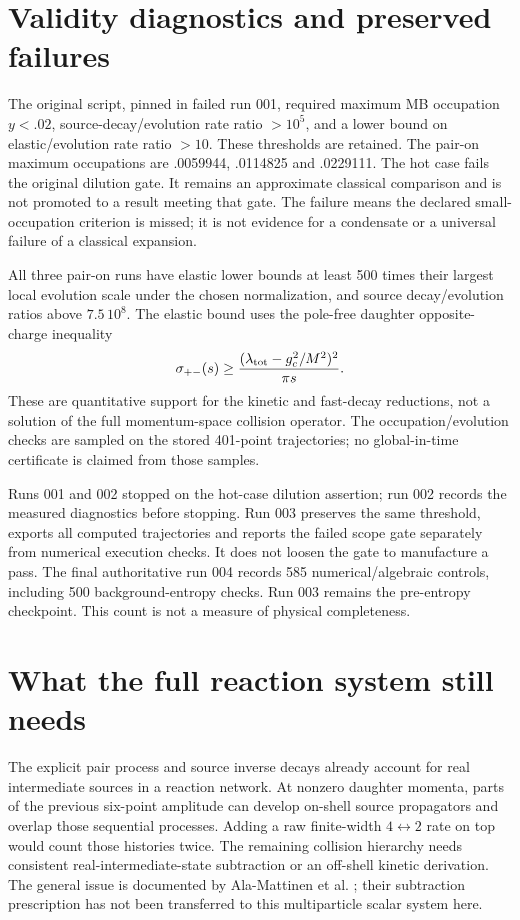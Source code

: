 \documentclass[11pt]{article}
\begin{document}
\section{Validity diagnostics and preserved failures}
The original script, pinned in failed run 001, required maximum MB
occupation $y<.02$, source-decay/evolution rate ratio $>10^5$, and a lower
bound on elastic/evolution rate ratio $>10$. These thresholds are retained.
The pair-on maximum occupations are .0059944, .0114825 and .0229111.
The hot case fails the original dilution gate. It remains an approximate
classical comparison and is not promoted to a result meeting that gate.
The failure means the declared small-occupation criterion is missed; it is
not evidence for a condensate or a universal failure of a classical expansion.

All three pair-on runs have elastic lower bounds at least 500 times their
largest local evolution scale under the chosen normalization, and source
decay/evolution ratios above $7.5\,10^8$. The elastic bound uses the
pole-free daughter opposite-charge inequality
\begin{equation}
 \sigma_{+-}(s)\ge\frac{(\lambda_{\rm tot}-g_c^2/M^2)^2}{\pi s}.
\end{equation}
These are quantitative support for the kinetic and fast-decay reductions,
not a solution of the full momentum-space collision operator. The
occupation/evolution checks are sampled on the stored 401-point trajectories;
no global-in-time certificate is claimed from those samples.

Runs 001 and 002 stopped on the hot-case dilution assertion; run 002 records
the measured diagnostics before stopping. Run 003 preserves the same
threshold, exports all computed trajectories and reports the failed scope
gate separately from numerical execution checks. It does not loosen the
gate to manufacture a pass. The final authoritative run 004 records
585 numerical/algebraic controls, including 500 background-entropy checks.
Run 003 remains the pre-entropy checkpoint. This count is not a
measure of physical completeness.

\section{What the full reaction system still needs}
The explicit pair process and source inverse decays already account for
real intermediate sources in a reaction network. At nonzero daughter
momenta, parts of the previous six-point amplitude can develop on-shell
source propagators and overlap those sequential processes. Adding a raw
finite-width $4\leftrightarrow2$ rate on top would count those histories twice.
The remaining collision hierarchy needs consistent real-intermediate-state
subtraction or an off-shell kinetic derivation. The general issue is
documented by Ala-Mattinen et al. \cite{ris}; their subtraction prescription
has not been transferred to this multiparticle scalar system here.
\end{document}
